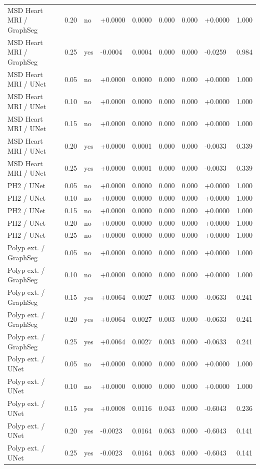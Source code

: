 \begin{table}[t]
\begin{tabular}{lllllllll}
MSD Heart MRI / GraphSeg & 0.20 & no & +0.0000 & 0.0000 & 0.000 & 0.000 & +0.0000 & 1.000 \\
MSD Heart MRI / GraphSeg & 0.25 & yes & -0.0004 & 0.0004 & 0.000 & 0.000 & -0.0259 & 0.984 \\
MSD Heart MRI / UNet & 0.05 & no & +0.0000 & 0.0000 & 0.000 & 0.000 & +0.0000 & 1.000 \\
MSD Heart MRI / UNet & 0.10 & no & +0.0000 & 0.0000 & 0.000 & 0.000 & +0.0000 & 1.000 \\
MSD Heart MRI / UNet & 0.15 & no & +0.0000 & 0.0000 & 0.000 & 0.000 & +0.0000 & 1.000 \\
MSD Heart MRI / UNet & 0.20 & yes & +0.0000 & 0.0001 & 0.000 & 0.000 & -0.0033 & 0.339 \\
MSD Heart MRI / UNet & 0.25 & yes & +0.0000 & 0.0001 & 0.000 & 0.000 & -0.0033 & 0.339 \\
PH2 / UNet & 0.05 & no & +0.0000 & 0.0000 & 0.000 & 0.000 & +0.0000 & 1.000 \\
PH2 / UNet & 0.10 & no & +0.0000 & 0.0000 & 0.000 & 0.000 & +0.0000 & 1.000 \\
PH2 / UNet & 0.15 & no & +0.0000 & 0.0000 & 0.000 & 0.000 & +0.0000 & 1.000 \\
PH2 / UNet & 0.20 & no & +0.0000 & 0.0000 & 0.000 & 0.000 & +0.0000 & 1.000 \\
PH2 / UNet & 0.25 & no & +0.0000 & 0.0000 & 0.000 & 0.000 & +0.0000 & 1.000 \\
Polyp ext. / GraphSeg & 0.05 & no & +0.0000 & 0.0000 & 0.000 & 0.000 & +0.0000 & 1.000 \\
Polyp ext. / GraphSeg & 0.10 & no & +0.0000 & 0.0000 & 0.000 & 0.000 & +0.0000 & 1.000 \\
Polyp ext. / GraphSeg & 0.15 & yes & +0.0064 & 0.0027 & 0.003 & 0.000 & -0.0633 & 0.241 \\
Polyp ext. / GraphSeg & 0.20 & yes & +0.0064 & 0.0027 & 0.003 & 0.000 & -0.0633 & 0.241 \\
Polyp ext. / GraphSeg & 0.25 & yes & +0.0064 & 0.0027 & 0.003 & 0.000 & -0.0633 & 0.241 \\
Polyp ext. / UNet & 0.05 & no & +0.0000 & 0.0000 & 0.000 & 0.000 & +0.0000 & 1.000 \\
Polyp ext. / UNet & 0.10 & no & +0.0000 & 0.0000 & 0.000 & 0.000 & +0.0000 & 1.000 \\
Polyp ext. / UNet & 0.15 & yes & +0.0008 & 0.0116 & 0.043 & 0.000 & -0.6043 & 0.236 \\
Polyp ext. / UNet & 0.20 & yes & -0.0023 & 0.0164 & 0.063 & 0.000 & -0.6043 & 0.141 \\
Polyp ext. / UNet & 0.25 & yes & -0.0023 & 0.0164 & 0.063 & 0.000 & -0.6043 & 0.141 \\
\bottomrule
\end{tabular}
\end{table}
